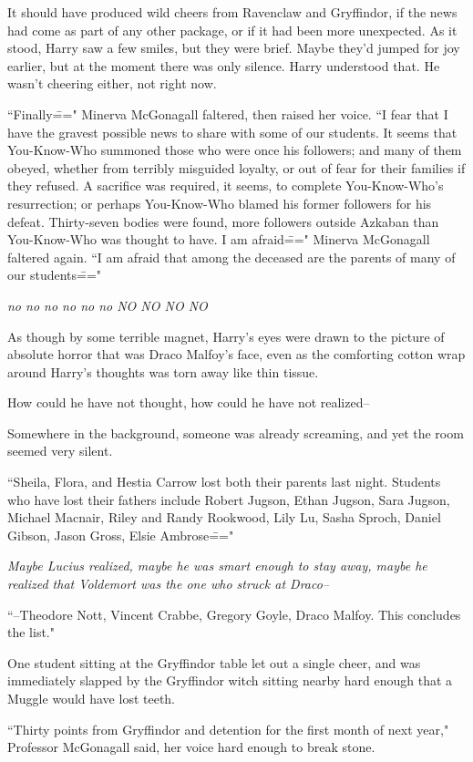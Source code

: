 It should have produced wild cheers from Ravenclaw and Gryffindor, if the news had come as part of any other package, or if it had been more unexpected. As it stood, Harry saw a few smiles, but they were brief. Maybe they'd jumped for joy earlier, but at the moment there was only silence. Harry understood that. He wasn't cheering either, not right now.

``Finally\===" Minerva McGonagall faltered, then raised her voice. ``I fear that I have the gravest possible news to share with some of our students. It seems that You-Know-Who summoned those who were once his followers; and many of them obeyed, whether from terribly misguided loyalty, or out of fear for their families if they refused. A sacrifice was required, it seems, to complete You-Know-Who's resurrection; or perhaps You-Know-Who blamed his former followers for his defeat. Thirty-seven bodies were found, more followers outside Azkaban than You-Know-Who was thought to have. I am afraid\===" Minerva McGonagall faltered again. ``I am afraid that among the deceased are the parents of many of our students\==="

\emph{no no no no no no NO NO NO NO}

As though by some terrible magnet, Harry's eyes were drawn to the picture of absolute horror that was Draco Malfoy's face, even as the comforting cotton wrap around Harry's thoughts was torn away like thin tissue.

How could he have not thought, how could he have not realized\---

Somewhere in the background, someone was already screaming, and yet the room seemed very silent.

``Sheila, Flora, and Hestia Carrow lost both their parents last night. Students who have lost their fathers include Robert Jugson, Ethan Jugson, Sara Jugson, Michael Macnair, Riley and Randy Rookwood, Lily Lu, Sasha Sproch, Daniel Gibson, Jason Gross, Elsie Ambrose\==="

\emph{Maybe Lucius realized, maybe he was smart enough to stay away, maybe he realized that Voldemort was the one who struck at Draco\---}

``\---Theodore Nott, Vincent Crabbe, Gregory Goyle, Draco Malfoy. This concludes the list."

One student sitting at the Gryffindor table let out a single cheer, and was immediately slapped by the Gryffindor witch sitting nearby hard enough that a Muggle would have lost teeth.

``Thirty points from Gryffindor and detention for the first month of next year," Professor McGonagall said, her voice hard enough to break stone.

